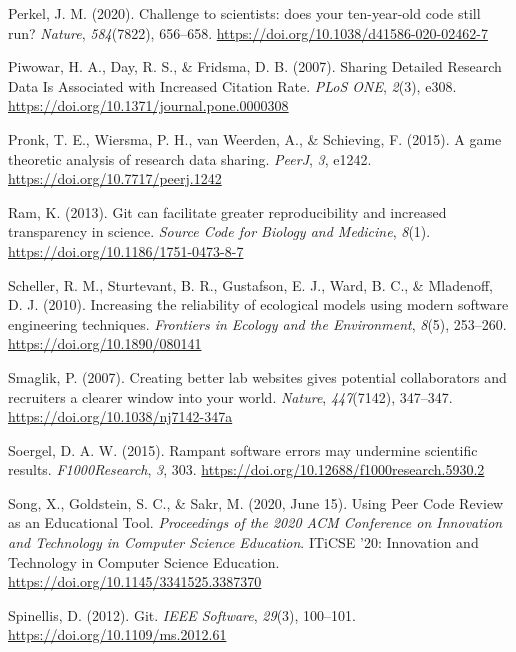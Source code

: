 \begin{CSLReferences}{1}{0}
\leavevmode{}%
Perkel, J. M. (2020). Challenge to scientists: does your ten-year-old code still run? \emph{Nature}, \emph{584}(7822), 656--658. \url{https://doi.org/10.1038/d41586-020-02462-7}

\leavevmode{}%
Piwowar, H. A., Day, R. S., \& Fridsma, D. B. (2007). Sharing Detailed Research Data Is Associated with Increased Citation Rate. \emph{PLoS ONE}, \emph{2}(3), e308. \url{https://doi.org/10.1371/journal.pone.0000308}

\leavevmode{}%
Pronk, T. E., Wiersma, P. H., van Weerden, A., \& Schieving, F. (2015). A game theoretic analysis of research data sharing. \emph{PeerJ}, \emph{3}, e1242. \url{https://doi.org/10.7717/peerj.1242}

\leavevmode{}%
Ram, K. (2013). Git can facilitate greater reproducibility and increased transparency in science. \emph{Source Code for Biology and Medicine}, \emph{8}(1). \url{https://doi.org/10.1186/1751-0473-8-7}

\leavevmode{}%
Scheller, R. M., Sturtevant, B. R., Gustafson, E. J., Ward, B. C., \& Mladenoff, D. J. (2010). Increasing the reliability of ecological models using modern software engineering techniques. \emph{Frontiers in Ecology and the Environment}, \emph{8}(5), 253--260. \url{https://doi.org/10.1890/080141}

\leavevmode{}%
Smaglik, P. (2007). Creating better lab websites gives potential collaborators and recruiters a clearer window into your world. \emph{Nature}, \emph{447}(7142), 347--347. \url{https://doi.org/10.1038/nj7142-347a}

\leavevmode{}%
Soergel, D. A. W. (2015). Rampant software errors may undermine scientific results. \emph{F1000Research}, \emph{3}, 303. \url{https://doi.org/10.12688/f1000research.5930.2}

\leavevmode{}%
Song, X., Goldstein, S. C., \& Sakr, M. (2020, June 15). Using Peer Code Review as an Educational Tool. \emph{Proceedings of the 2020 ACM Conference on Innovation and Technology in Computer Science Education}. ITiCSE '20: Innovation and Technology in Computer Science Education. \url{https://doi.org/10.1145/3341525.3387370}

\leavevmode{}%
Spinellis, D. (2012). Git. \emph{IEEE Software}, \emph{29}(3), 100--101. \url{https://doi.org/10.1109/ms.2012.61}


\end{CSLReferences}
